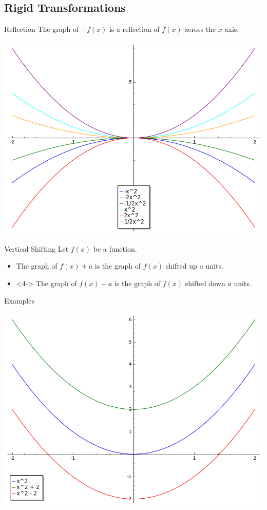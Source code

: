 \documentclass{beamer}
\theoremstyle{definition}
\begin{document}
\subsection{Rigid Transformations}
\begin{frame}{Reflection}
  The graph of $-f(x)$ is a reflection of $f(x)$ across the $x$-axis.
  \begin{center}
    \includegraphics[scale=0.4]{imgs/reflections.png}
  \end{center}
\end{frame}

\begin{frame}{Vertical Shifting}
  Let $f(x)$ be a function.
  \begin{itemize}
    \item<3->
      The graph of $f(x) + a$ is the graph of $f(x)$ shifted up $a$ units.
    \item
      <4->
      The graph of $f(x) - a$ is the graph of $f(x)$ shifted down $a$ units.
  \end{itemize}
\end{frame}

\begin{frame}{Examples}
  \begin{center}
    \includegraphics[scale=0.4]{imgs/vertShift.png}
  \end{center}
\end{frame}
\end{document}
